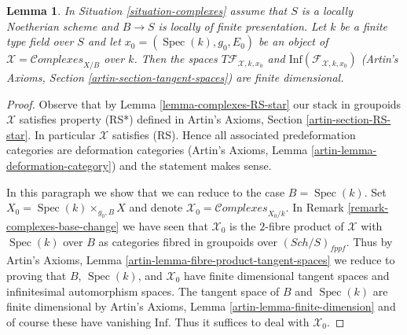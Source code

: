 \documentclass[10pt,a4paper]{amsart}
\theoremstyle{plain}
\newtheorem{lemma}[subsection]{Lemma}
\theoremstyle{definition}
\theoremstyle{remark}
\numberwithin{equation}{subsection}
\def\Spec{\mathop{\mathrm{Spec}}}
\def\Sch{\mathit{Sch}}
\def\Complexesstack{\mathcal{C}\!\mathit{omplexes}}
\begin{document}
\begin{lemma}
\label{lemma-complexes-tangent-space}
In Situation \ref{situation-complexes} assume that $S$ is a locally Noetherian
scheme and $B \to S$ is locally of finite presentation.
Let $k$ be a finite type field over $S$ and let
$x_0 = (\Spec(k), g_0, E_0)$
be an object of $\mathcal{X} = \Complexesstack_{X/B}$ over $k$.
Then the spaces $T\mathcal{F}_{\mathcal{X}, k, x_0}$ and
$\text{Inf}(\mathcal{F}_{\mathcal{X}, k, x_0})$
(Artin's Axioms, Section \ref{artin-section-tangent-spaces})
are finite dimensional.
\end{lemma}

\begin{proof}
Observe that by Lemma \ref{lemma-complexes-RS-star}
our stack in groupoids $\mathcal{X}$ satisfies property (RS*)
defined in Artin's Axioms, Section \ref{artin-section-RS-star}.
In particular $\mathcal{X}$ satisfies (RS).
Hence all associated predeformation
categories are deformation categories
(Artin's Axioms, Lemma \ref{artin-lemma-deformation-category})
and the statement makes sense.

\medskip\noindent
In this paragraph we show that we can reduce to the case $B = \Spec(k)$.
Set $X_0 = \Spec(k) \times_{g_0, B} X$
and denote $\mathcal{X}_0 = \Complexesstack_{X_0/k}$. In
Remark \ref{remark-complexes-base-change} we have seen that
$\mathcal{X}_0$ is the $2$-fibre product of $\mathcal{X}$ with
$\Spec(k)$ over $B$ as categories fibred in groupoids over
$(\Sch/S)_{fppf}$. Thus by
Artin's Axioms, Lemma \ref{artin-lemma-fibre-product-tangent-spaces}
we reduce to proving that $B$, $\Spec(k)$, and $\mathcal{X}_0$
have finite dimensional tangent spaces and infinitesimal automorphism
spaces. The tangent space of $B$ and $\Spec(k)$ are finite dimensional by
Artin's Axioms, Lemma \ref{artin-lemma-finite-dimension}
and of course these have vanishing $\text{Inf}$.
Thus it suffices to deal with $\mathcal{X}_0$.


\end{proof}
\end{document}
